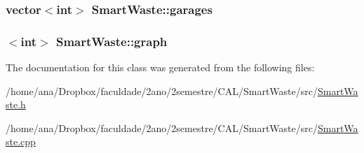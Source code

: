 \subsubsection[{\texorpdfstring{garages}{garages}}]{\setlength{\rightskip}{0pt plus 5cm}vector$<$int$>$ Smart\+Waste\+::garages\hspace{0.3cm}{\ttfamily [private]}}\hypertarget{classSmartWaste_a624a2893edb7c0e00e4fefe635a0c597}{}\label{classSmartWaste_a624a2893edb7c0e00e4fefe635a0c597}
\subsubsection[{\texorpdfstring{graph}{graph}}]{$<$int$>$ Smart\+Waste\+::graph\hspace{0.3cm}{\ttfamily [private]}}\hypertarget{classSmartWaste_a653f3e0a3fb2148fb3e59ec9532f6d04}{}\label{classSmartWaste_a653f3e0a3fb2148fb3e59ec9532f6d04}


The documentation for this class was generated from the following files\+:\begin{DoxyCompactItemize}
\item 
/home/ana/\+Dropbox/faculdade/2ano/2semestre/\+C\+A\+L/\+Smart\+Waste/src/\hyperlink{SmartWaste_8h}{Smart\+Waste.\+h}\item 
/home/ana/\+Dropbox/faculdade/2ano/2semestre/\+C\+A\+L/\+Smart\+Waste/src/\hyperlink{SmartWaste_8cpp}{Smart\+Waste.\+cpp}\end{DoxyCompactItemize}
